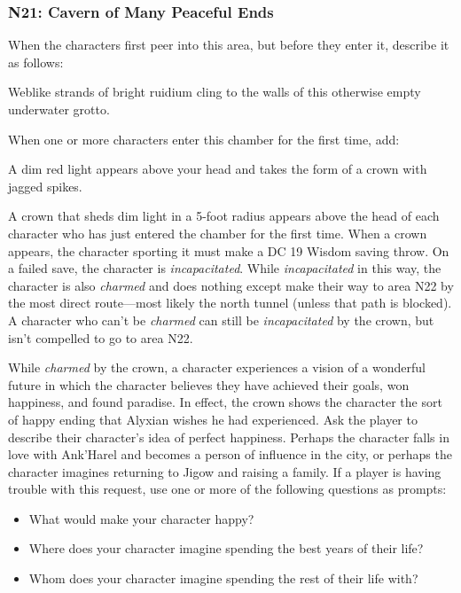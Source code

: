 \documentclass[a4paper, 11pt, bg=full, twocolumn, nooutline]{dndbook}
\begin{document}
\subsubsection{N21: Cavern of Many Peaceful Ends}

When the characters first peer into this area, but before they enter it, describe it as follows:

\begin{DndReadAloud}
Weblike strands of bright ruidium cling to the walls of this otherwise empty underwater grotto.
\end{DndReadAloud}

When one or more characters enter this chamber for the first time, add:

\begin{DndReadAloud}
A dim red light appears above your head and takes the form of a crown with jagged spikes.
\end{DndReadAloud}

A crown that sheds dim light in a 5-foot radius appears above the head of each character who has just entered the chamber for the first time. When a crown appears, the character sporting it must make a DC 19 Wisdom saving throw. On a failed save, the character is \textit{incapacitated}. While \textit{incapacitated} in this way, the character is also \textit{charmed} and does nothing except make their way to area N22 by the most direct route---most likely the north tunnel (unless that path is blocked). A character who can't be \textit{charmed} can still be \textit{incapacitated} by the crown, but isn't compelled to go to area N22.

While \textit{charmed} by the crown, a character experiences a vision of a wonderful future in which the character believes they have achieved their goals, won happiness, and found paradise. In effect, the crown shows the character the sort of happy ending that Alyxian wishes he had experienced. Ask the player to describe their character's idea of perfect happiness. Perhaps the character falls in love with Ank'Harel and becomes a person of influence in the city, or perhaps the character imagines returning to Jigow and raising a family. If a player is having trouble with this request, use one or more of the following questions as prompts:

\begin{itemize}
\item What would make your character happy?
\item Where does your character imagine spending the best years of their life?
\item Whom does your character imagine spending the rest of their life with?
\end{itemize}
\end{document}
